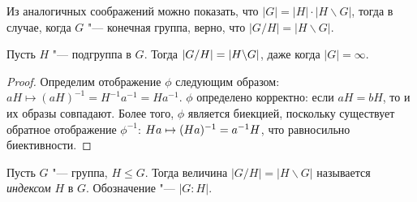 \begin{note}
	Из аналогичных соображений можно показать, что $|G| = |H|\cdot|H\backslash G|$, тогда в случае, когда $G$ "--- конечная группа, верно, что $|G / H| = |H\backslash G|$.
\end{note}

\begin{proposition}
	Пусть $H$ "--- подгруппа в $G$. Тогда $|G / H| \hm{=} |H\backslash G|$, даже когда $|G| = \infty$.
\end{proposition}

\begin{proof}
	Определим отображение $\phi$ следующим образом: $aH \mapsto (aH)^{-1} = H^{-1}a^{-1} = Ha^{-1}$. $\phi$ определено корректно: если $aH = bH$, то и их образы совпадают. Более того, $\phi$ является биекцией, поскольку существует обратное отображение $\phi^{-1}$: $Ha \hm{\mapsto} (Ha)^{-1} = a^{-1}H$, что равносильно биективности.
\end{proof}

\begin{definition}
	Пусть $G$ "--- группа, $H \le G$. Тогда величина $|G / H| = |H\backslash G|$ называется \textit{индексом} $H$ в $G$. Обозначение "--- $|G : H|$.
\end{definition}
